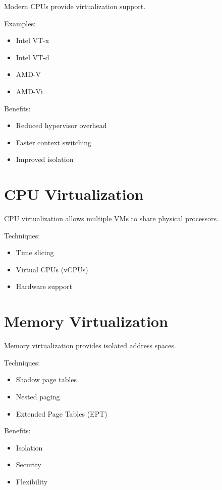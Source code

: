 Modern CPUs provide virtualization support.

Examples:

\begin{itemize}
\item Intel VT-x
\item Intel VT-d
\item AMD-V
\item AMD-Vi
\end{itemize}

Benefits:

\begin{itemize}
\item Reduced hypervisor overhead
\item Faster context switching
\item Improved isolation
\end{itemize}

\section{CPU Virtualization}

CPU virtualization allows multiple VMs to share physical processors.

Techniques:

\begin{itemize}
\item Time slicing
\item Virtual CPUs (vCPUs)
\item Hardware support
\end{itemize}

\section{Memory Virtualization}

Memory virtualization provides isolated address spaces.

Techniques:

\begin{itemize}
\item Shadow page tables
\item Nested paging
\item Extended Page Tables (EPT)
\end{itemize}

Benefits:

\begin{itemize}
\item Isolation
\item Security
\item Flexibility
\end{itemize}


